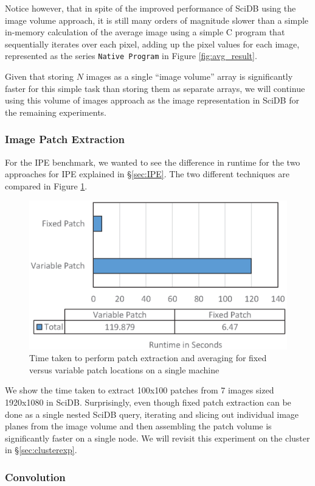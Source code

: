 \documentclass[letterpaper,twocolumn,10pt]{article}
\begin{document}
Notice however, that in spite of the improved performance of SciDB using the image volume approach, it is still many orders of magnitude slower than a simple in-memory calculation of the average image using a simple C program that sequentially iterates over each pixel, adding up the pixel values for each image, represented as the series \texttt{Native Program} in Figure \ref{fig:avg_result}.

Given that storing $N$ images as a single ``image volume'' array is significantly faster for this simple task than storing them as separate arrays, we will continue using this volume of images approach as the image representation in SciDB for the remaining experiments.

\subsubsection{Image Patch Extraction}
For the IPE benchmark, we wanted to see the difference in runtime for the two approaches for IPE explained in \S\ref{sec:IPE}. The two different techniques are compared in Figure \ref{fig:patch_result}. 

\begin{figure}[h]
\centering
\includegraphics[width=.45\textwidth]{figures/patch_result_single.eps}
\caption{Time taken to perform patch extraction and averaging for fixed versus variable patch locations on a single machine}
\label{fig:patch_result}
\end{figure}

We show the time taken to extract 100x100 patches from 7 images sized 1920x1080 in SciDB. Surprisingly, even though fixed patch extraction can be done as a single nested SciDB query, iterating and slicing out individual image planes from the image volume and then assembling the patch volume is significantly faster on a single node. We will revisit this experiment on the cluster in \S \ref{sec:clusterexp}.

\subsubsection{Convolution}
\end{document}
